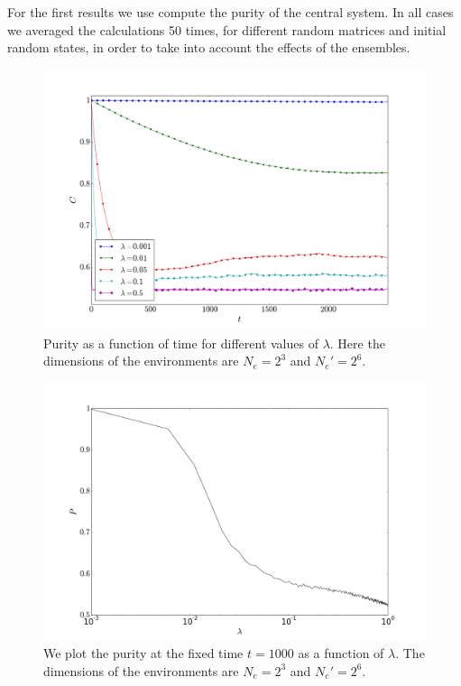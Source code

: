 \documentclass[floatfix]{article}
\begin{document}
For the first results we use compute the purity of the central system. In all cases we averaged the calculations
50 times, for different random matrices and initial random states, in order to take into account the effects of the ensembles.
\begin{figure}[H] 
 \centering
 \includegraphics[width=.8\textwidth]{grafica1.png}
 \caption{Purity as a function of time for different values of $\lambda$. Here the dimensions of the environments
 are $N_e=2^3$ and $N_e'=2^6$.}
\end{figure} 


\begin{figure}[H] 
 \centering
 \includegraphics[width=.8\textwidth]{grafica2.png}
  \caption{ We plot the purity at the fixed time $t=1000$ as a function of $\lambda$. The dimensions of the environments
 are $N_e=2^3$ and $N_e'=2^6$.}
\end{figure} 
\end{document}
